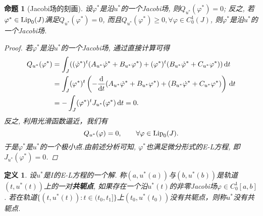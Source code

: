 \documentclass[12pt,a4paper]{article}
\newtheorem{definition}[theorem]{定义}
\newtheorem{proposition}[theorem]{命题}
\begin{document}
\begin{proposition}[Jacobi场的刻画]\label{prop1.15}
    设$\varphi^*$是沿$u^*$的一个Jacobi场, 则$Q_{u^*}(\varphi^*) = 0$;
    反之, 若$\varphi^* \in {\rm Lip}_0(J)$满足$Q_{u^*}(\varphi^*) = 0$, 而且$Q_{u^*}(\varphi^*) \geq 0, \forall \varphi \in C_0^1(J)$, 则$\varphi^*$是沿$u^*$的一个Jacobi场.
    \begin{proof}
        若$\varphi^*$是沿$u^*$的一个Jacobi场, 通过直接计算可得
        \begin{align} 
            Q_{u^*}(\varphi^*) &= \int_J((\dot\varphi^*)^t(A_{u^*}\dot{\varphi}^* +B_{u^*}\varphi^*) + (\varphi^*)^t(B_{u^*}\dot\varphi^* + C_{u^*}\varphi^*)) \,{\rm d}t \\ 
            &= \int_J(\varphi^*)^t\left(-\frac{{\rm d}}{{\rm d}t}(A_{u^*}\dot\varphi^* + B_{u^*}\varphi^*) + (B_{u^*}\dot\varphi^* + C_{u^*}\varphi^*)\right) \,{\rm d}t \\  
            &= -\int_J (\varphi^*)^t J_{u^*}(\varphi^*) \,{\rm d}t = 0. 
        \end{align} 
        反之, 利用光滑函数逼近，我们有
        \begin{equation*}
            Q_{u^*}(\varphi) = 0, \qquad \forall \varphi \in {\rm Lip}_0(J). 
        \end{equation*}
        于是$\varphi^*$是$u^*$的一个极小点.由前述分析可知, $\varphi^*$也满足微分形式的E-L方程, 即$J_{u^*}(\varphi^*) = 0$. 
    \end{proof}
\end{proposition}

\begin{definition}
    设$u^*$是$I$的E-L方程的一个解. 称$(a, u^*(a))$与$(b, u^*(b))$是轨道$(t, u^*(t))$上的一对\textbf{共轭点}, 如果存在一个沿$u^*(t)$的非零Jacobi场$\varphi \in C_0^1[a, b]$.
    若在轨道$\{(t, u^*(t))\colon t \in (t_0, t_1]\}$上$(t_0, u^*(t_0))$没有共轭点，则称$u^*$没有共轭点.
\end{definition}
\end{document}
